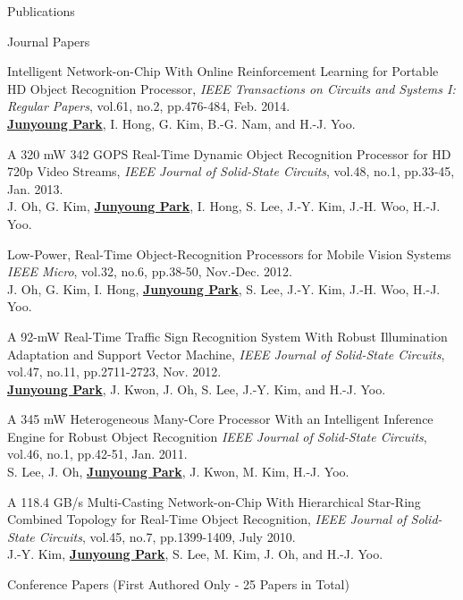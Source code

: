 \documentclass{resume} %
\begin{document}
\begin{section}{Publications}
\begin{subsection}{Journal Papers}{}{}{}
\item Intelligent Network-on-Chip With Online Reinforcement Learning for Portable HD Object Recognition Processor, \emph{IEEE Transactions on Circuits and Systems I: Regular Papers}, vol.61, no.2, pp.476-484, Feb. 2014. \\
{\small \underline{\bf Junyoung Park}, I. Hong, G. Kim, B.-G. Nam, and H.-J. Yoo.}

\item A 320 mW 342 GOPS Real-Time Dynamic Object Recognition Processor for HD 720p Video Streams, \emph{IEEE Journal of Solid-State Circuits}, vol.48, no.1, pp.33-45, Jan. 2013. \\
{\small J. Oh, G. Kim, \underline{\bf Junyoung Park}, I. Hong, S. Lee, J.-Y. Kim, J.-H. Woo, H.-J. Yoo.}

\item Low-Power, Real-Time Object-Recognition Processors for Mobile Vision Systems \emph{IEEE Micro}, vol.32, no.6, pp.38-50, Nov.-Dec. 2012. \\
{\small J. Oh, G. Kim, I. Hong, \underline{\bf Junyoung Park}, S. Lee, J.-Y. Kim, J.-H. Woo, H.-J. Yoo.}

\item A 92-mW Real-Time Traffic Sign Recognition System With Robust Illumination Adaptation and Support Vector Machine, \emph{IEEE Journal of Solid-State Circuits}, vol.47, no.11, pp.2711-2723, Nov. 2012. \\
{\small \underline{\bf Junyoung Park}, J. Kwon, J. Oh, S. Lee, J.-Y. Kim, and H.-J. Yoo.}

\item A 345 mW Heterogeneous Many-Core Processor With an Intelligent Inference Engine for Robust Object Recognition \emph{IEEE Journal of Solid-State Circuits}, vol.46, no.1, pp.42-51, Jan. 2011. \\
{\small S. Lee, J. Oh, \underline{\bf Junyoung Park}, J. Kwon, M. Kim, H.-J. Yoo.}

\item A 118.4 GB/s Multi-Casting Network-on-Chip With Hierarchical Star-Ring Combined Topology for Real-Time Object Recognition, \emph{IEEE Journal of Solid-State Circuits}, vol.45, no.7, pp.1399-1409, July 2010. \\
{\small J.-Y. Kim, \underline{\bf Junyoung Park}, S. Lee, M. Kim, J. Oh, and H.-J. Yoo.}

\end{subsection}

\begin{subsection}{Conference Papers (First Authored Only - 25 Papers in Total)}{}{}{}


\end{subsection}
\end{section}
\end{document}
